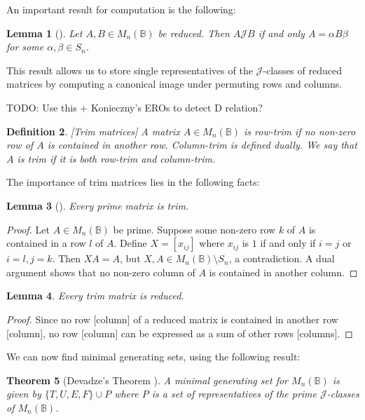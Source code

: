 \documentclass[11pt]{article}
\newtheorem{thm}{Theorem}[section]
\newtheorem{lemma}[thm]{Lemma}
\newtheorem{defi}[thm]{Definition}
\newenvironment{de}{\begin{defi}\rm}{\end{defi}}
\numberwithin{equation}{section}
\newcommand{\B}{\mathbb{B}}
\newcommand{\Bn}{M_n(\B)}
\newcommand{\J}{\mathscr{J}}
\begin{document}
An important result for computation is the following:
\begin{lemma}[\cite{Plemmons1970}]
  Let $A, B \in \Bn$ be reduced. Then $A \J B$ if and only $A = \alpha B \beta$
  for some $\alpha, \beta \in S_n$. 
\end{lemma}

This result allows us to store single representatives of the $\J$-classes of
reduced matrices by computing a canonical image under permuting rows and
columns.

TODO: Use this + Konieczny's EROs to detect D relation?

\begin{de}[Trim matrices]
  A matrix $A \in \Bn$ is \emph{row-trim} if no non-zero row of $A$ is contained in
  another row. \emph{Column-trim} is defined dually. We say that $A$ is
  \emph{trim} if it is both row-trim and column-trim.
\end{de}

The importance of trim matrices lies in the following facts:
\begin{lemma}[\cite{Konieczny2011}]
  Every prime matrix is trim.
\end{lemma}
\begin{proof}
  Let $A \in \Bn$ be prime. Suppose some non-zero row $k$ of $A$ is contained in
  a row $l$ of $A$. Define $X = [x_{ij}]$ where $x_{ij}$ is $1$ if and only if
  $i = j$ or $i = l, j = k$. Then $XA = A$, but $X, A \in \Bn \setminus S_n$, a
  contradiction. A dual argument shows that no non-zero column of $A$ is
  contained in another column.
\end{proof}

\begin{lemma}
  Every trim matrix is reduced.
\end{lemma}
\begin{proof}
  Since no row [column] of a reduced matrix is contained in another row
  [column], no row [column] can be expressed as a sum of other rows [columns].
\end{proof}


We can now find minimal generating sets, using the following result:
\begin{thm}[Devadze's Theorem \cite{Konieczny2011}]
  A minimal generating set for $\Bn$ is given by $\{T, U, E, F\} \cup P$
  where $P$ is a set of representatives of the prime $\J$-classes of $\Bn$.
\end{thm}
\end{document}
